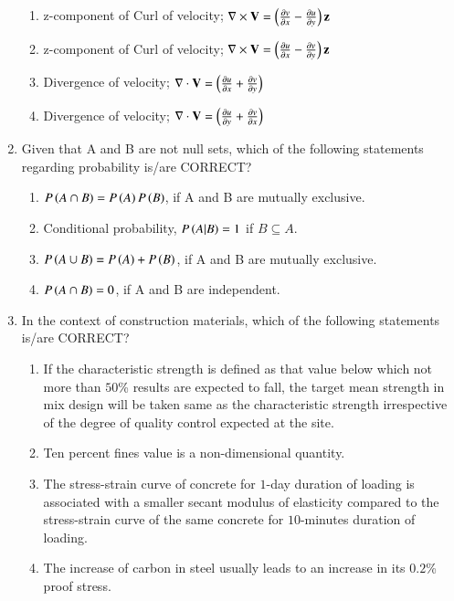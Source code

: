 \documentclass[journal,12pt,onecolumn]{article}
\theoremstyle{remark}
\begin{document}
\begin{enumerate}
    \hfill{}
    \begin{enumerate}
        \item z-component of Curl of velocity; $\nabla \times \mathbf{V} = \left(\frac{\partial v}{\partial x} - \frac{\partial u}{\partial y}\right)\mathbf{z}$
        \item z-component of Curl of velocity; $\nabla \times \mathbf{V} = \left(\frac{\partial u}{\partial x} - \frac{\partial v}{\partial y}\right)\mathbf{z}$
        \item Divergence of velocity; $\nabla \cdot \mathbf{V} = \left(\frac{\partial u}{\partial x} + \frac{\partial v}{\partial y}\right)$
        \item Divergence of velocity; $\nabla \cdot \mathbf{V} = \left(\frac{\partial u}{\partial y} + \frac{\partial v}{\partial x}\right)$
    \end{enumerate}

    \item Given that A and B are not null sets, which of the following statements regarding probability is/are CORRECT?

    \hfill{}
    \begin{enumerate}
        \item $P\left(A \cap B\right) = P\left(A\right) P\left(B\right)$, if A and B are mutually exclusive.
        \item Conditional probability, $P\left(A|B\right) = 1$ if $B \subseteq A$.
        \item $P\left(A \cup B\right) = P\left(A\right) + P\left(B\right)$, if A and B are mutually exclusive.
        \item $P\left(A \cap B\right) = 0$, if A and B are independent.
    \end{enumerate}

    \item In the context of construction materials, which of the following statements is/are CORRECT?

    \hfill{}
    \begin{enumerate}
        \item If the characteristic strength is defined as that value below which not more than $50$\% results are expected to fall, the target mean strength in mix design will be taken same as the characteristic strength irrespective of the degree of quality control expected at the site.
        \item Ten percent fines value is a non-dimensional quantity.
        \item The stress-strain curve of concrete for $1$-day duration of loading is associated with a smaller secant modulus of elasticity compared to the stress-strain curve of the same concrete for $10$-minutes duration of loading.
        \item The increase of carbon in steel usually leads to an increase in its $0.2$\% proof stress.
    \end{enumerate}


\end{enumerate}
\end{document}
